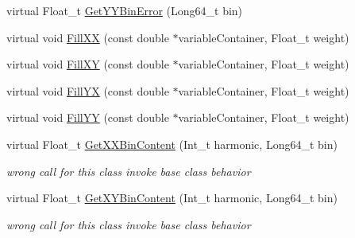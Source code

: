 \begin{DoxyCompactItemize}
virtual Float\+\_\+t \mbox{\hyperlink{classQn_1_1CorrectionProfileCorrelationComponents_a4952dd516dbd12a66c7a385cbc51cc6b}{Get\+Y\+Y\+Bin\+Error}} (Long64\+\_\+t bin)
\item 
virtual void \mbox{\hyperlink{classQn_1_1CorrectionProfileCorrelationComponents_adebd3ce6b05ef6c65c1288132951ba22}{Fill\+XX}} (const double $\ast$variable\+Container, Float\+\_\+t weight)
\item 
virtual void \mbox{\hyperlink{classQn_1_1CorrectionProfileCorrelationComponents_a05d2d17173f5a6aaccb4bd8cb9aece3a}{Fill\+XY}} (const double $\ast$variable\+Container, Float\+\_\+t weight)
\item 
virtual void \mbox{\hyperlink{classQn_1_1CorrectionProfileCorrelationComponents_a8c011aed3281ab3d9fd8fd83e43ad384}{Fill\+YX}} (const double $\ast$variable\+Container, Float\+\_\+t weight)
\item 
virtual void \mbox{\hyperlink{classQn_1_1CorrectionProfileCorrelationComponents_af033e682edd09ce172db1f23cf4d6865}{Fill\+YY}} (const double $\ast$variable\+Container, Float\+\_\+t weight)
\item 
\mbox{\label{classQn_1_1CorrectionProfileCorrelationComponents_a7db7b8e5a7a11b91de593ed60c9ed84a}} 
virtual Float\+\_\+t \mbox{\hyperlink{classQn_1_1CorrectionProfileCorrelationComponents_a7db7b8e5a7a11b91de593ed60c9ed84a}{Get\+X\+X\+Bin\+Content}} (Int\+\_\+t harmonic, Long64\+\_\+t bin)
\begin{DoxyCompactList}\small\item\em wrong call for this class invoke base class behavior \end{DoxyCompactList}\item 
\mbox{\label{classQn_1_1CorrectionProfileCorrelationComponents_aec422c5e452b98fed97dbe57f8613314}} 
virtual Float\+\_\+t \mbox{\hyperlink{classQn_1_1CorrectionProfileCorrelationComponents_aec422c5e452b98fed97dbe57f8613314}{Get\+X\+Y\+Bin\+Content}} (Int\+\_\+t harmonic, Long64\+\_\+t bin)
\begin{DoxyCompactList}\small\item\em wrong call for this class invoke base class behavior \end{DoxyCompactList}\item 
\mbox{\label{classQn_1_1CorrectionProfileCorrelationComponents_a81c1b7bd19dca53c3e1e9407daffc1e6}} 

\end{DoxyCompactItemize}
